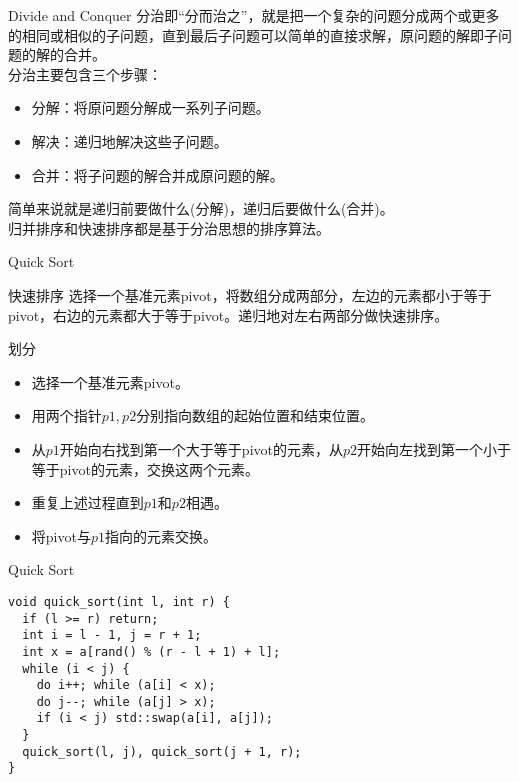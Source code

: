 \documentclass{ldr-simple-gray}
\begin{document}
  \begin{frame}{Divide and Conquer}
      分治即“分而治之”，就是把一个复杂的问题分成两个或更多的相同或相似的子问题，直到最后子问题可以简单的直接求解，原问题的解即子问题的解的合并。
      \\

      分治主要包含三个步骤：
      \begin{itemize}
        \item 分解：将原问题分解成一系列子问题。
        \item 解决：递归地解决这些子问题。
        \item 合并：将子问题的解合并成原问题的解。
      \end{itemize}

      简单来说就是递归前要做什么(分解)，递归后要做什么(合并)。
      \\

      归并排序和快速排序都是基于分治思想的排序算法。
    \end{frame}

  \begin{frame}{Quick Sort}
    \begin{block}{快速排序}
      选择一个基准元素pivot，将数组分成两部分，左边的元素都小于等于pivot，右边的元素都大于等于pivot。递归地对左右两部分做快速排序。
    \end{block}
    \begin{block}{划分}
      \begin{itemize}
        \item 选择一个基准元素pivot。
        \item 用两个指针$p1,p2$分别指向数组的起始位置和结束位置。
        \item 从$p1$开始向右找到第一个大于等于pivot的元素，从$p2$开始向左找到第一个小于等于pivot的元素，交换这两个元素。
        \item 重复上述过程直到$p1$和$p2$相遇。
        \item 将pivot与$p1$指向的元素交换。
      \end{itemize}
    \end{block}
  \end{frame}

  \begin{frame}[fragile]{Quick Sort}
    \begin{verbatim}
void quick_sort(int l, int r) {
  if (l >= r) return;
  int i = l - 1, j = r + 1;
  int x = a[rand() % (r - l + 1) + l];
  while (i < j) {
    do i++; while (a[i] < x);
    do j--; while (a[j] > x);
    if (i < j) std::swap(a[i], a[j]);
  }
  quick_sort(l, j), quick_sort(j + 1, r);
}
    \end{verbatim}
  \end{frame}
\end{document}
